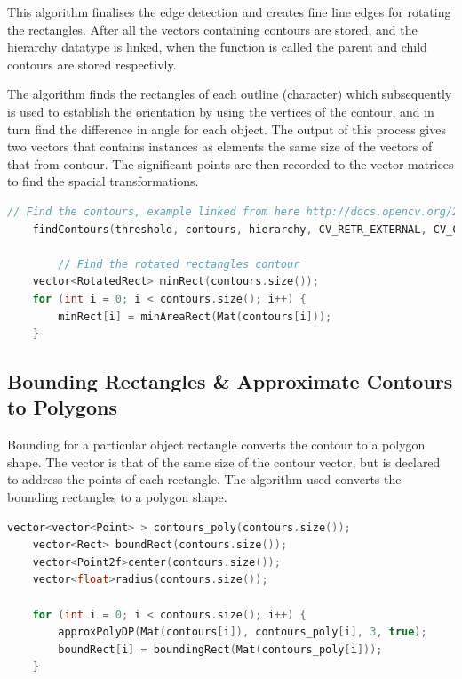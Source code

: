 \documentclass[a4paper, 10pt]{article}
\begin{document}
This algorithm finalises the edge detection and creates fine line edges for rotating the rectangles. After all the vectors containing contours are stored, and the hierarchy datatype is linked, when the function is called the parent and child contours are stored respectivly.

The algorithm finds the rectangles of each outline (character) which subsequently is used to establish the orientation by using the vertices of the contour, and in turn find the difference in angle for each object. The output of this process gives two vectors that contains instances as elements the same size of the vectors of that from contour. The significant points are then recorded to the vector matrices to find the spacial transformations. 

\begin{lstlisting}[language = C++]
	// Find the contours, example linked from here http://docs.opencv.org/2.4/doc/tutorials/imgproc/shapedescriptors/find_contours/find_contours.html
	findContours(threshold, contours, hierarchy, CV_RETR_EXTERNAL, CV_CHAIN_APPROX_NONE, Point(0, 0));
	
		// Find the rotated rectangles contour
	vector<RotatedRect> minRect(contours.size());
	for (int i = 0; i < contours.size(); i++) {
		minRect[i] = minAreaRect(Mat(contours[i]));
	}
\end{lstlisting}


\subsection{Bounding Rectangles \& Approximate Contours to Polygons}

Bounding for a particular object rectangle converts the contour to a polygon shape. The vector is that of the same size of the contour vector, but is declared to address the points of each rectangle. The algorithm used converts the bounding rectangles to a polygon shape.

\begin{lstlisting}[language = C++]
	vector<vector<Point> > contours_poly(contours.size());
	vector<Rect> boundRect(contours.size());
	vector<Point2f>center(contours.size());
	vector<float>radius(contours.size());

	for (int i = 0; i < contours.size(); i++) {
		approxPolyDP(Mat(contours[i]), contours_poly[i], 3, true);
		boundRect[i] = boundingRect(Mat(contours_poly[i]));
	}
\end{lstlisting}
\end{document}
